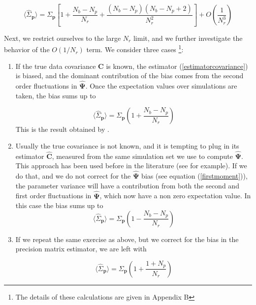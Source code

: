 \documentclass[reprint,aps,prd,superscriptaddress,showkeys,showpacs]{revtex4-1}
\newcommand{\bb}[1]{\mathbf{#1}}
\newcommand{\bbh}[1]{\mathbf{\hat{#1}}}
\newcommand{\h}[1]{\hat{#1}}
\begin{document}
\begin{widetext}
\begin{equation}
\label{quarticdegradation}
\langle\h{\Sigma}_\bb{p}\rangle = \Sigma_\bb{p}\left[1+\frac{N_b-N_p}{N_r}+\frac{(N_b-N_p)(N_b-N_p+2)}{N_r^2}\right] + O\left(\frac{1}{N_r^3}\right)
\end{equation}
\end{widetext}
%
Next, we restrict ourselves to the large $N_r$ limit, and we further investigate the behavior of the $O(1/N_r)$ term. We consider three cases \footnote{The details of these calculations are given in Appendix B}:
\begin{enumerate}
\item If the true data covariance $\bb{C}$ is known, the estimator (\ref{estimatorcovariance}) is biased, and the dominant contribution of the bias comes from the second order fluctuations in $\bbh{\Psi}$. Once the expectation values over simulations are taken, the bias sums up to 

\begin{equation}
\label{dodelsonscaling}
\langle\h{\Sigma}_\bb{p}\rangle=\Sigma_\bb{p}\left(1+\frac{N_b-N_p}{N_r}\right)
\end{equation}
%
This is the result obtained by \citep{DodelsonSchneider13}.

\item Usually the true covariance is not known, and it is tempting to plug in its estimator $\bbh{C}$, measured from the same simulation set we use to compute $\bbh{\Psi}$. This approach has been used before in the literature (see \citep{MinkPetri,MinkShirasaki} for example). If we do that, and we do not correct for the $\bbh{\Psi}$ bias (see equation (\ref{firstmoment})), the parameter variance will have a contribution from both the second and first order fluctuations in $\bbh{\Psi}$, which now have a non zero expectation value. In this case the bias sums up to 
\begin{equation}
\label{mockscalinguncorrected}
\langle\h{\Sigma}_\bb{p}\rangle=\Sigma_\bb{p}\left(1-\frac{N_b-N_p}{N_r}\right)
\end{equation}

\item If we repeat the same exercise as above, but we correct for the bias in the precision matrix estimator, we are left with 

\begin{equation}
\label{mockscalingcorrected}
\langle\h{\Sigma}_\bb{p}\rangle=\Sigma_\bb{p}\left(1+\frac{1+N_p}{N_r}\right)
\end{equation}

\end{enumerate} 
\end{document}
